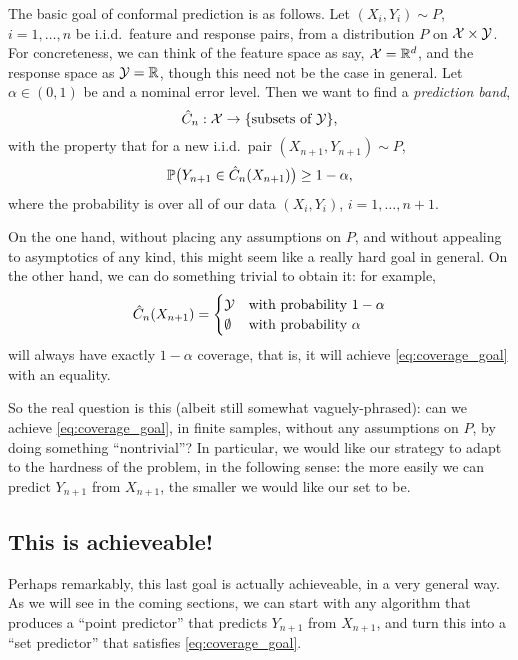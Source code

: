 \documentclass{article}
\begin{document}
The basic goal of conformal prediction is as follows. Let $(X_i,Y_i) \sim P$,
$i=1,\dots,n$ be i.i.d.\ feature and response pairs, from a distribution 
$P$ on $\mathcal{X} \times \mathcal{Y}$. For concreteness, we can think of the feature space as
say, $\mathcal{X} = \mathbb{R}^d$, and the response space as $\mathcal{Y} = \mathbb{R}$, though this need not be 
the case in general. Let $\alpha \in (0,1)$ be and a nominal error level. Then
we want to find a \emph{prediction band}, 
\[
\hat{C}_n : \mathcal{X} \to \{ \text{subsets of $\mathcal{Y}$} \},
\]
with the property that for a new i.i.d.\ pair $(X_{n+1},Y_{n+1}) \sim P$,
\begin{equation}
\label{eq:coverage_goal}
\mathbb{P}\big( Y_{n+1} \in \hat{C}_n(X_{n+1}) \big) \geq 1-\alpha,
\end{equation}
where the probability is over all of our data $(X_i,Y_i)$, $i=1,\dots,n+1$. 

On the one hand, without placing any assumptions on $P$, and without appealing
to asymptotics of any kind, this might seem like a really hard goal in
general. On the other hand, we can do something trivial to obtain it: for example,   
\[
\hat{C}_n(X_{n+1}) = 
\begin{cases}
\mathcal{Y} & \text{with probability $1-\alpha$} \\
\emptyset & \text{with probability $\alpha$}
\end{cases}
\]
will always have exactly $1-\alpha$ coverage, that is, it will achieve
\eqref{eq:coverage_goal} with an equality.   

So the real question is this (albeit still somewhat vaguely-phrased): can we
achieve \eqref{eq:coverage_goal}, in finite samples, without any assumptions on
$P$, by doing something ``nontrivial''? In particular, we would like our
strategy to adapt to the hardness of the problem, in the following sense: the
more easily we can predict $Y_{n+1}$ from $X_{n+1}$, the smaller we would like
our set  to be. 

\subsection{This is achieveable!}
\label{sec:no_features}

Perhaps remarkably, this last goal is actually achieveable, in a very general
way. As we will see in the coming sections, we can start with any algorithm that
produces a ``point predictor''  that predicts $Y_{n+1}$ from
$X_{n+1}$, and turn this into a ``set predictor''  that satisfies
\eqref{eq:coverage_goal}. 
\end{document}

